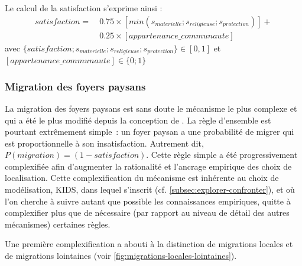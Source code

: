 Le calcul de la satisfaction s'exprime ainsi :
\begin{equation*}
\begin{split}
satisfaction =~& 0.75 \times \left[ min \left( s_{materielle} ; s_ {religieuse}; s_{protection} \right) \right] + \\
& 0.25 \times [appartenance\_communaute]
\end{split}
\end{equation*}
avec $ \{satisfaction ; s_{materielle} ; s_ {religieuse} ; s_{protection}\} \in [0,1]$ et $[appartenance\_communaute] \in \{0;1\} $


	\subsubsection{Migration des foyers paysans \label{sssec:migration}}

La migration des foyers paysans est sans doute le mécanisme le plus complexe et qui a été le plus modifié depuis la conception de \simfeodal{}.
La règle d'ensemble est pourtant extrêmement simple : un foyer paysan a une probabilité de migrer qui est proportionnelle à son insatisfaction. 
Autrement dit, $P \left( migration \right) = \left( 1 - satisfaction \right)$.
Cette règle simple a été progressivement complexifiée afin d'augmenter la rationalité et l'ancrage empirique des choix de localisation.
Cette complexification du mécanisme est inhérente au choix de modélisation, KIDS, dans lequel \simfeodal{} s'inscrit (cf. \cref{subsec:explorer-confronter}), et où l'on cherche à suivre autant que possible les connaissances empiriques, quitte à complexifier plus que de nécessaire (par rapport au niveau de détail des autres mécanismes) certaines règles.

Une première complexification a abouti à la distinction de migrations \og locales\fg{} et de migrations \og lointaines\fg{} (voir \cref{fig:migrations-locales-lointaines}).

